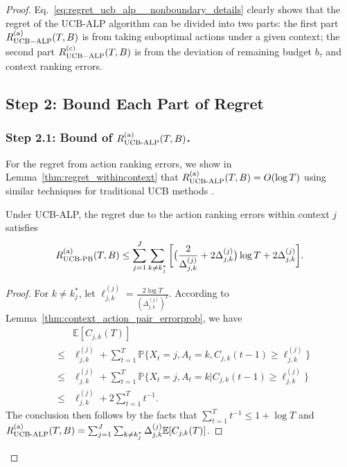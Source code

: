 \begin{proof}
Eq.~\eqref{eq:regret_ucb_alp__nonboundary_details} clearly shows that the regret of the UCB-ALP algorithm can be divided into two parts: the first part $R_{\rm {UCB-ALP}}^{({\rm a})}(T, B)$ is from taking  suboptimal actions under a given context; the second part $R_{\rm {UCB-ALP}}^{({\rm c})}(T, B)$ is from the deviation of remaining budget $b_{\tau}$ and context ranking errors.

\subsection{Step 2: Bound Each Part of Regret}

\subsubsection{Step 2.1: Bound of $R_{\text{UCB-ALP}}^{\rm (a)}(T, B)$.}
For the regret from action ranking errors,
we show in Lemma~\ref{thm:regret_withincontext} that $R_{\text{UCB-ALP}}^{\rm (a)}(T, B) = O(\log T)$ using similar techniques for traditional UCB methods \cite{Golovin2009Lecture}.
\begin{lemma}\label{thm:regret_withincontext}
Under UCB-ALP, the regret due to the action ranking errors within context $j$ satisfies
\begin{eqnarray} \label{eq:regret_ucb_alp_regret_withincontext}
R_{\text{UCB-PB}}^{\rm (a)}(T, B) \leq \sum_{j=1}^J \sum_{k \neq k_j^*} \bigg[\big(\frac{2}{\Delta_{j,k}^{(j)}} + 2\Delta_{j,k}^{(j)}\big) \log T + 2 \Delta_{j,k}^{(j)}\bigg].
\end{eqnarray}
\end{lemma}
\begin{proof}
For $k \neq k_j^*$, let $\ell_{j,k}^{(j)} = \frac{2\log T}{(\Delta_{j, k}^{(j)})^2}$. According to Lemma~\ref{thm:context_action_pair_errorprob}, we have
\begin{eqnarray}
&& \mathbb{E}[C_{j,k}(T)] \nonumber \\
&\leq& \ell_{j,k}^{(j)} + \sum_{t = 1}^T \mathbb{P}\{X_t = j, A_t = k, C_{j,k}(t-1) \geq \ell_{j,k}^{(j)}\} \nonumber \\
&\leq & \ell_{j,k}^{(j)} + \sum_{t = 1}^T \mathbb{P}\{X_t = j, A_t = k | C_{j,k}(t-1) \geq \ell_{j,k}^{(j)}\} \nonumber \\
&\leq & \ell_{j,k}^{(j)} + 2\sum_{t = 1}^Tt^{-1}. \nonumber
\end{eqnarray}
The conclusion then follows by the facts that $\sum_{t = 1}^T t^{-1} \leq 1 + \log T$ and $R_{\text{UCB-ALP}}^{\rm (a)}(T, B) =  \sum_{j = 1}^J\sum_{k \neq k_j^*} \Delta_{j,k}^{(j)} \mathbb{E}[C_{j,k}(T)]$.
\end{proof}


\end{proof}
